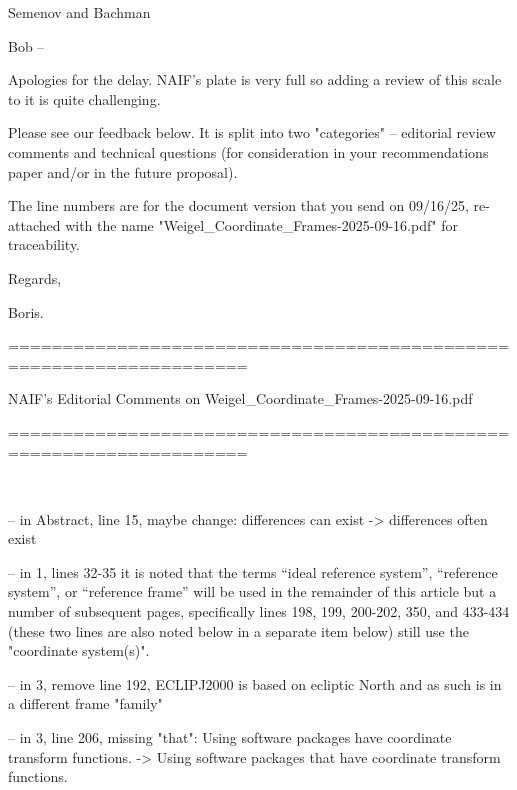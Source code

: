 Semenov and Bachman

Bob –

 

Apologies for the delay. NAIF's plate is very full so adding a review of this scale to it is quite challenging.

 

Please see our feedback below. It is split into two "categories" – editorial review comments and technical questions (for consideration in your recommendations paper and/or in the future proposal).

 

The line numbers are for the document version that you send on 09/16/25, re-attached with the name "Weigel_Coordinate_Frames-2025-09-16.pdf" for traceability.

 

Regards,

Boris.

 

====================================================================

NAIF's Editorial Comments on Weigel_Coordinate_Frames-2025-09-16.pdf

====================================================================

 

﻿

-- in Abstract, line 15, maybe change: differences can exist -> differences often exist

 

 

-- in 1, lines 32-35 it is noted that the terms “ideal reference system”, “reference system”, or “reference frame” will be used in the remainder of this article but a number of subsequent pages, specifically lines 198, 199, 200-202, 350, and 433-434 (these two lines are also noted below in a separate item below) still use the "coordinate system(s)".

 

 

-- in 3, remove line 192,  ECLIPJ2000 is based on ecliptic North and as such is in a different frame "family"

 

 

-- in 3, line 206, missing "that": Using software packages have coordinate transform functions. -> Using software packages that have coordinate transform functions.

 

